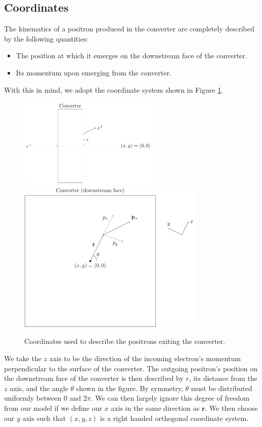 \documentclass[12pt]{article}
\newcommand{\rrr}{\mathbf{r}}
\begin{document}
\subsection{Coordinates}
The kinematics of a positron produced in the converter are completely described by the following quantities:
\begin{itemize}
\item
The position at which it emerges on the downstream face of the converter.

\item
Its momentum upon emerging from the converter.

\end{itemize}

With this in mind, we adopt the coordinate system shown in Figure \ref{fig:coords}.
\begin{figure}
\centering
\includegraphics[width=0.6\textwidth]{coords1.pdf}
\includegraphics[width=0.8\textwidth]{coords2.pdf}
\caption{Coordinates used to describe the positrons exiting the converter.}
\label{fig:coords}
\end{figure}
We take the $z$ axis to be the direction of the incoming electron's momentum perpendicular to the surface of the converter.
The outgoing positron's position on the downstream face of the converter is then described by $r$, its distance from the $z$ axis, and the angle $\theta$ shown in the figure.
By symmetry, $\theta$ must be distributed uniformly between $0$ and $2\pi$.
We can then largely ignore this degree of freedom from our model if we define our $x$ axis in the same direction as $\rrr$.
We then choose our $y$ axis such that $(x,y,z)$ is a right handed orthogonal coordinate system.
\end{document}
